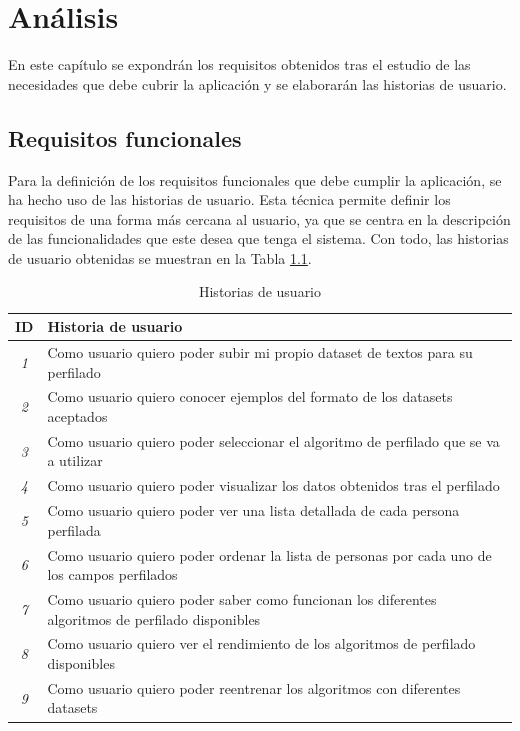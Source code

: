 \chapter{Análisis}
\label{chap:analisis}

En este capítulo se expondrán los requisitos obtenidos tras el estudio de las necesidades que debe cubrir la aplicación
y se elaborarán las historias de usuario.

\section{Requisitos funcionales}
\label{sec:analisis_requisitos_funcionales}

Para la definición de los requisitos funcionales que debe cumplir la aplicación, se ha hecho uso de las historias de usuario.
Esta técnica permite definir los requisitos de una forma más cercana al usuario, ya que se centra en la descripción
de las funcionalidades que este desea que tenga el sistema. Con todo, las historias de usuario obtenidas se muestran en la
Tabla \ref{tab:historias_usuario}.

\bigskip
\begin{table}[H]
  \centering
  \begin{tabular}{c|p{11cm}}
		\rowcolor{udcpink!25}
		\small \textbf{ID} & \small \textbf{Historia de usuario} \\\hline
		\small \textit{1} & \small Como usuario quiero poder subir mi propio dataset de textos para su perfilado \\
		\small \textit{2} & \small Como usuario quiero conocer ejemplos del formato de los datasets aceptados \\
		\small \textit{3} & \small Como usuario quiero poder seleccionar el algoritmo de perfilado que se va a utilizar \\
		\small \textit{4} & \small Como usuario quiero poder visualizar los datos obtenidos tras el perfilado \\
		\small \textit{5} & \small Como usuario quiero poder ver una lista detallada de cada persona perfilada \\
		\small \textit{6} & \small Como usuario quiero poder ordenar la lista de personas por cada uno de los campos perfilados \\
		\small \textit{7} & \small Como usuario quiero poder saber como funcionan los diferentes algoritmos de perfilado disponibles \\
		\small \textit{8} & \small Como usuario quiero ver el rendimiento de los algoritmos de perfilado disponibles \\
		\small \textit{9} & \small Como usuario quiero poder reentrenar los algoritmos con diferentes datasets \\
  \end{tabular}
  \caption{Historias de usuario}
  \label{tab:historias_usuario}
\end{table}

